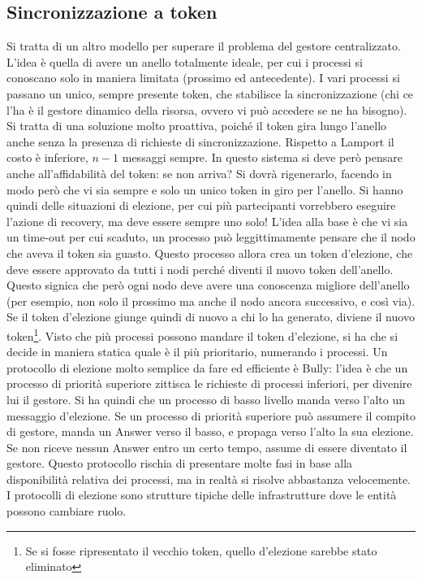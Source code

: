 \subsection{Sincronizzazione a token}
Si tratta di un altro modello per superare il problema del gestore centralizzato. L'idea è quella di avere un anello
totalmente ideale, per cui i processi si conoscano solo in maniera limitata (prossimo ed antecedente). I vari processi
si passano un unico, sempre presente token, che stabilisce la sincronizzazione (chi ce l'ha è il gestore dinamico della
risorsa, ovvero vi può accedere se ne ha bisogno). Si tratta di una soluzione molto proattiva, poiché il token gira
lungo l'anello anche senza la presenza di richieste di sincronizzazione. Rispetto a Lamport il costo è inferiore, 
$n-1$ messaggi sempre.
In questo sistema si deve però pensare anche all'affidabilità del token: se non arriva? Si dovrà rigenerarlo, facendo
in modo però che vi sia sempre e solo un unico token in giro per l'anello. Si hanno quindi delle situazioni di elezione,
per cui più partecipanti vorrebbero eseguire l'azione di recovery, ma deve essere sempre uno solo! L'idea alla base è
che vi sia un time-out per cui scaduto, un processo può leggittimamente pensare che il nodo che aveva il token sia
guasto.
Questo processo allora crea un token d'elezione, che deve essere approvato da tutti i nodi perché diventi il nuovo 
token dell'anello. Questo signica che però ogni nodo deve avere una conoscenza migliore dell'anello (per esempio, non
solo il prossimo ma anche il nodo ancora successivo, e così via). Se il token d'elezione giunge quindi di nuovo a chi
lo ha generato, diviene il nuovo token\footnote{Se si fosse ripresentato il vecchio token, quello d’elezione sarebbe
stato eliminato}. Visto che più processi possono mandare il token d'elezione, si ha che si decide in maniera
statica quale è il più prioritario, numerando i processi.
Un protocollo di elezione molto semplice da fare ed efficiente è Bully: l'idea è che un processo di priorità superiore
zittisca le richieste di processi inferiori, per divenire lui il gestore. Si ha quindi che un processo di basso livello
manda verso l'alto un messaggio d'elezione. Se un processo di priorità superiore può assumere il compito di gestore,
manda un Answer verso il basso, e propaga verso l'alto la sua elezione. Se non riceve nessun Answer entro un certo
tempo, assume di essere diventato il gestore. Questo protocollo rischia di presentare molte fasi in base alla
disponibilità relativa dei processi, ma in realtà si risolve abbastanza velocemente. I protocolli di elezione sono
strutture tipiche delle infrastrutture dove le entità possono cambiare ruolo.
